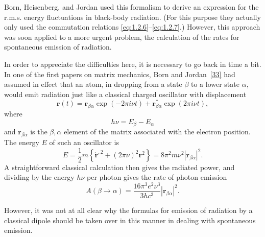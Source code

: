 Born, Heisenberg, and Jordan used this formalism to derive an expression for
the r.m.s. energy fluctuations in black-body radiation. (For this purpose they
actually only used the commutation relations \eqref{eq:1.2.6}--\eqref{eq:1.2.7}.) However, this
approach was soon applied to a more urgent problem, the calculation of the
rates for spontaneous emission of radiation.

In order to appreciate the difficulties here, it is necessary to go back in
time a bit. In one of the first papers on matrix mechanics, Born and Jordan~\hyperref[ref:1.33]{[33]}
had assumed in effect that an atom, in dropping from a state $\beta$ to a lower
state $\alpha$, would emit radiation just like a classical charged oscillator
with displacement
\begin{equation}
  \mathbf r(t)=\mathbf r_{\beta\alpha}\exp(-2\pi i\nu t)
    +\mathbf r_{\beta\alpha}^{*}\exp(2\pi i\nu t),
  \tag{1.2.16}\label{eq:1.2.16}
\end{equation}
where
\begin{equation}
  h\nu=E_{\beta}-E_{\alpha}
  \tag{1.2.17}\label{eq:1.2.17}
\end{equation}
and $\mathbf r_{\beta\alpha}$ is the $\beta,\alpha$ element of the matrix
associated with the electron position. The energy $E$ of such an oscillator is
\begin{equation}
  E=\frac12m\left\{\dot{\mathbf r}^{,2}+(2\pi\nu)^2\mathbf r^2\right\}
   =8\pi^2m\nu^2|\mathbf r_{\beta\alpha}|^2.
  \tag{1.2.18}\label{eq:1.2.18}
\end{equation}
A straightforward classical calculation then gives the radiated power, and
dividing by the energy $h\nu$ per photon gives the rate of photon emission
\begin{equation}
  A(\beta\to\alpha)
  =\frac{16\pi^3e^2\nu^3}{3hc^3}|\mathbf r_{\beta\alpha}|^2.
  \tag{1.2.19}\label{eq:1.2.19}
\end{equation}

However, it was not at all clear why the formulas for emission of radiation
by a classical dipole should be taken over in this manner in dealing with
spontaneous emission.

